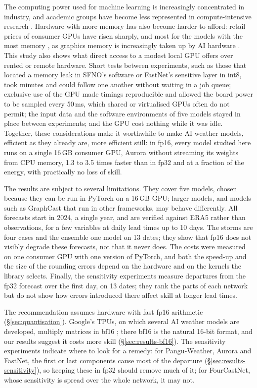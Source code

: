 The computing power used for machine learning is increasingly
concentrated in industry, and academic groups have become less
represented in compute-intensive research
\citep{ahmed2020dedemocratization, besiroglu2024compute}. Hardware with
more memory has also become harder to afford: retail prices of consumer GPUs
have risen sharply, and most for the models with the most memory
\citep{techtimes2026gpu}, as graphics memory is increasingly taken up by AI
hardware \citep{trendforce2026memory}. This study also shows what direct access to
a modest local GPU offers over rented or remote hardware. Short tests
between experiments, such as those that located a memory leak in SFNO's
software or FastNet's sensitive layer in int8, took minutes and could
follow one another without waiting in a job queue; exclusive use of the GPU made timings reproducible
and allowed the board power to be sampled every 50\,ms, which shared or
virtualised GPUs often do not permit; the input data and the software
environments of five models stayed in place between experiments; and
the GPU cost nothing while it was idle. Together, these considerations
make it worthwhile to make AI weather models, efficient as they already
are, more efficient still: in fp16, every model studied here runs on a
single 16\,GB consumer GPU, Aurora without streaming its weights from CPU
memory, 1.3 to 3.5 times faster than in fp32 and at a fraction of the
energy, with practically no loss of skill.

The results are subject to several limitations. They cover five
models, chosen because they can be run in PyTorch on a 16\,GB GPU; larger
models, and models such as GraphCast that run in other frameworks, may
behave differently. All forecasts start in 2024, a single year, and are
verified against ERA5 rather than observations, for a few variables at
daily lead times up to 10 days. The storms are four cases and the
ensemble one model on 13 dates; they show that fp16 does not visibly
degrade these forecasts, not that it never does. The costs were measured
on one consumer GPU with one version of PyTorch, and both the speed-up
and the size of the rounding errors depend on the hardware and on the
kernels the library selects. Finally, the sensitivity experiments
measure departures from the fp32 forecast over the first day, on 13
dates; they rank the parts of each network but do not show how errors
introduced there affect skill at longer lead times.

The recommendation assumes hardware with fast fp16 arithmetic
(\S\ref{sec:quantisation}). Google's TPUs, on which several AI
weather models are developed, multiply matrices in bf16
\citep{wang2019bfloat16}; there bf16 is the natural 16-bit format, and
our results suggest it costs more skill (\S\ref{sec:results-bf16}). The
sensitivity experiments indicate where to look for a remedy: for
Pangu-Weather, Aurora and FastNet, the first or last components cause
most of the departure (\S\ref{sec:results-sensitivity}), so keeping these
in fp32 should remove much of it; for FourCastNet, whose sensitivity is
spread over the whole network, it may not.

